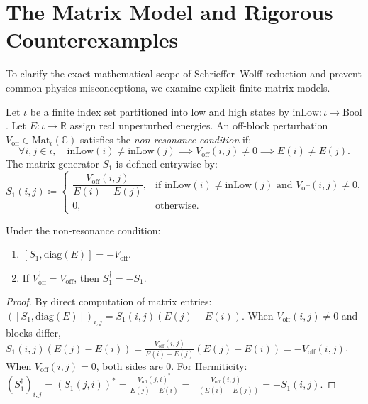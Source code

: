 \section{The Matrix Model and Rigorous Counterexamples}

To clarify the exact mathematical scope of Schrieffer--Wolff reduction and prevent common physics misconceptions, we examine explicit finite matrix models.

\begin{definition}
Let $\iota$ be a finite index set partitioned into low and high states by $\mathrm{inLow} : \iota \to \mathrm{Bool}$. Let $E : \iota \to \mathbb{R}$ assign real unperturbed energies. An off-block perturbation $V_{\mathrm{off}} \in \mathrm{Mat}_\iota(\mathbb{C})$ satisfies the \emph{non-resonance condition} if:
\begin{equation}
\forall i, j \in \iota, \quad \mathrm{inLow}(i) \neq \mathrm{inLow}(j) \implies V_{\mathrm{off}}(i, j) \neq 0 \implies E(i) \neq E(j).
\end{equation}
The matrix generator $S_1$ is defined entrywise by:
\begin{equation}
S_1(i, j) \coloneqq \begin{cases} \dfrac{V_{\mathrm{off}}(i, j)}{E(i) - E(j)}, & \text{if } \mathrm{inLow}(i) \neq \mathrm{inLow}(j) \text{ and } V_{\mathrm{off}}(i, j) \neq 0, \\ 0, & \text{otherwise}. \end{cases}
\end{equation}
\end{definition}

\begin{theorem}
\label{thm:app_matrix_generator}
Under the non-resonance condition:
\begin{enumerate}
    \item $[S_1, \mathrm{diag}(E)] = - V_{\mathrm{off}}$.
    \item If $V_{\mathrm{off}}^\dagger = V_{\mathrm{off}}$, then $S_1^\dagger = - S_1$.
\end{enumerate}
\end{theorem}

\begin{proof}
By direct computation of matrix entries:
$([S_1, \mathrm{diag}(E)])_{i, j} = S_1(i, j) (E(j) - E(i))$.
When $V_{\mathrm{off}}(i, j) \neq 0$ and blocks differ, $S_1(i, j) (E(j) - E(i)) = \frac{V_{\mathrm{off}}(i, j)}{E(i) - E(j)}(E(j) - E(i)) = -V_{\mathrm{off}}(i, j)$.
When $V_{\mathrm{off}}(i, j) = 0$, both sides are 0.
For Hermiticity: $(S_1^\dagger)_{i, j} = (S_1(j, i))^* = \frac{V_{\mathrm{off}}(j, i)^*}{E(j) - E(i)} = \frac{V_{\mathrm{off}}(i, j)}{-(E(i) - E(j))} = -S_1(i, j)$.
\end{proof}

